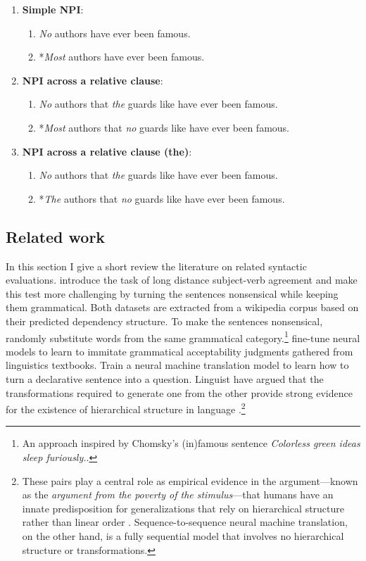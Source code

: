 \begin{enumerate}[noitemsep]
  \item \textbf{Simple NPI}:
    \begin{enumerate}
      \item \textit{No} authors have ever been famous.
      \item *\textit{Most} authors have ever been famous.
    \end{enumerate}
  \item \textbf{NPI across a relative clause}:
    \begin{enumerate}
      \item \textit{No} authors that \textit{the} guards like have ever been famous.
      \item *\textit{Most} authors that \textit{no} guards like have ever been famous.
    \end{enumerate}
  \item \textbf{NPI across a relative clause (the)}:
    \begin{enumerate}
      \item \textit{No} authors that \textit{the} guards like have ever been famous.
      \item *\textit{The} authors that \textit{no} guards like have ever been famous.
    \end{enumerate}
\end{enumerate}

\subsection{Related work}
In this section I give a short review the literature on related syntactic evaluations. \citet{linzen2016syntax} introduce the task of long distance subject-verb agreement and \citet{gulordava2018colorless} make this test more challenging by turning the sentences nonsensical while keeping them grammatical. Both datasets are extracted from a wikipedia corpus based on their predicted dependency structure. To make the sentences nonsensical, \citet{gulordava2018colorless} randomly substitute words from the same grammatical category.\footnote{An approach inspired by Chomsky's (in)famous sentence \textit{Colorless green ideas sleep furiously.}.} \citet{warstadt2018acceptability} fine-tune neural models to learn to immitate grammatical acceptability judgments gathered from linguistics textbooks.
\citet{mccoy2018revisiting} Train a neural machine translation model to learn how to turn a declarative sentence into a question. Linguist have argued that the transformations required to generate one from the other provide strong evidence for the existence of hierarchical structure in language \cite{everaert2015structures}.\footnote{These pairs play a central role as empirical evidence in the argument---known as the \textit{argument from the poverty of the stimulus}---that humans have an innate predisposition for generalizations that rely on hierarchical structure rather than linear order \citep{chomsky1980rules}. Sequence-to-sequence neural machine translation, on the other hand, is a fully sequential model that involves no hierarchical structure or transformations.}


